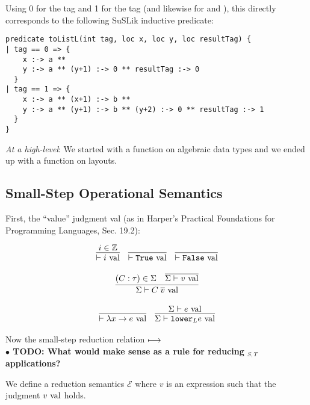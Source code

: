 \documentclass[10pt]{article}
\begin{document}
Using 0 for the  tag and 1 for the  tag (and likewise for  and ), this directly corresponds to the following SuSLik
inductive predicate:

\begin{lstlisting}
predicate toListL(int tag, loc x, loc y, loc resultTag) {
| tag == 0 => {
    x :-> a **
    y :-> a ** (y+1) :-> 0 ** resultTag :-> 0
  }
| tag == 1 => {
    x :-> a ** (x+1) :-> b **
    y :-> a ** (y+1) :-> b ** (y+2) :-> 0 ** resultTag :-> 1
  }
}
\end{lstlisting}

\noindent
\textit{At a high-level}: We started with a function on algebraic data types and we ended up with a function
on layouts.

\subsection{Small-Step Operational Semantics}

First, the ``value'' judgment val (as in Harper's Practical Foundations for Programming Languages, Sec. 19.2):

\[
  \begin{array}{cc}
    \infer{\vdash i \val}{i \in \mathbb{Z}}
    ~~~
    \infer{\vdash \True \val}{}
    ~~~
    \infer{\vdash \False \val}{}
    \\\\
    \infer{\Sigma \vdash C\; \overline{v} \val}{(C : \tau) \in \Sigma & \overline{\Sigma \vdash v \val}}
    \\\\
    \infer{\vdash \lambda x \ra e \val}{}
    ~~~
    \infer{\Sigma \vdash \lowerS{L} e \val}{\Sigma \vdash e \val}
  \end{array}
\]

\noindent
Now the small-step reduction relation $\longmapsto$\\

\textbf{$\bullet$ TODO: What would make sense as a rule for reducing $_{S,T}$ applications?}

We define a reduction semantics $\mathcal{E}$ where $v$ is an expression such that the judgment $v \textnormal{ val}$ holds.
\end{document}
